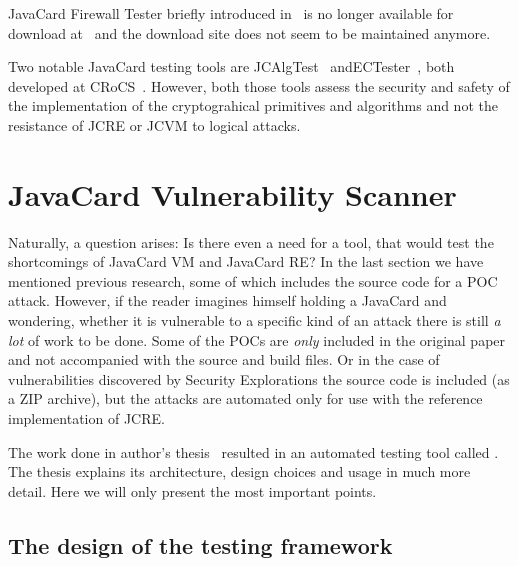 \documentclass{../llncs/llncs}
\begin{document}

JavaCard Firewall Tester briefly introduced in~\cite{Mostowski07testingthe} is no longer available for download at~\cite{firewalltester} and the download site does not seem to be maintained anymore.

Two notable JavaCard testing tools are JCAlgTest~\cite{jcalgtest} and\linebreak ECTester~\cite{ectester}, both developed at CRoCS~\cite{crocsweb}. However, both those tools assess the security and safety of the implementation of the cryptograhical primitives and algorithms and not the resistance of JCRE or JCVM to logical attacks.

\section{JavaCard Vulnerability Scanner}\label{sec:javacard-vulnerability-scanner}
Naturally, a question arises: Is there even a need for a tool, that would test the shortcomings of JavaCard VM and JavaCard RE?  In the last section we have mentioned previous research, some of which includes the source code for a POC attack. However, if the reader imagines himself holding a JavaCard and wondering, whether it is vulnerable to a specific kind of an attack there is still \textit{a lot} of work to be done. Some of the POCs are \textit{only} included in the original paper and not accompanied with the source and build files. Or in the case of vulnerabilities discovered by Security Explorations the source code is included (as a ZIP archive), but the attacks are automated only for use with the reference implementation of JCRE.

    The work done in author's thesis~\cite{anon2020thesis} resulted in an automated testing tool called \projectname. The thesis explains its architecture, design choices and usage in much more detail. Here we will only present the most important points.
    
    \subsection{The design of the testing framework}
\end{document}
